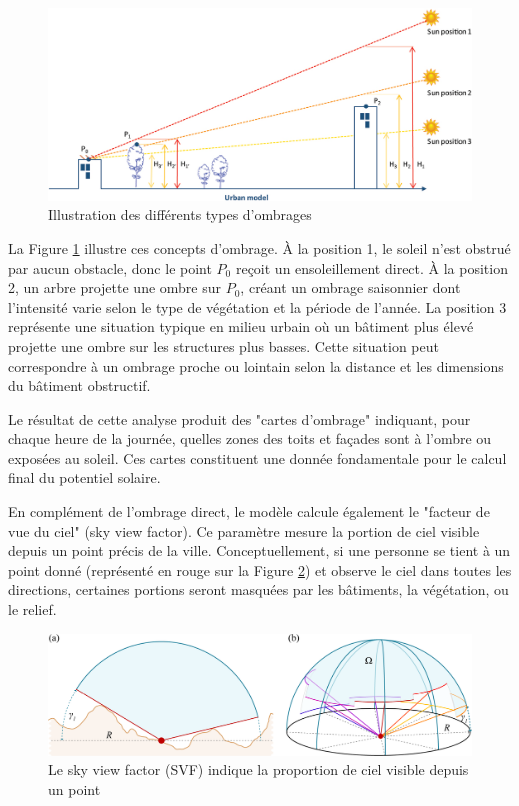 \begin{figure}[H]
    \centering
    \includegraphics[width=1.00\linewidth]{02-main/figures/ch2/cadastre_solaire_ombrage.jpg}
    \caption{Illustration des différents types d'ombrages \cite{desthieux_solar_2018}}
    \label{fig:cadastre_solaire_ombrage}
\end{figure}
\par{La Figure \ref{fig:cadastre_solaire_ombrage} illustre ces concepts d'ombrage. À la position 1, le soleil n'est obstrué par aucun obstacle, donc le point $P_0$ reçoit un ensoleillement direct. À la position 2, un arbre projette une ombre sur $P_0$, créant un ombrage saisonnier dont l'intensité varie selon le type de végétation et la période de l'année. La position 3 représente une situation typique en milieu urbain où un bâtiment plus élevé projette une ombre sur les structures plus basses. Cette situation peut correspondre à un ombrage proche ou lointain selon la distance et les dimensions du bâtiment obstructif.}
\par{Le résultat de cette analyse produit des "cartes d'ombrage" indiquant, pour chaque heure de la journée, quelles zones des toits et façades sont à l'ombre ou exposées au soleil. Ces cartes constituent une donnée fondamentale pour le calcul final du potentiel solaire.}
\par{En complément de l'ombrage direct, le modèle calcule également le "facteur de vue du ciel" (sky view factor). Ce paramètre mesure la portion de ciel visible depuis un point précis de la ville. Conceptuellement, si une personne se tient à un point donné (représenté en rouge sur la Figure \ref{fig:cadastre_solaire_svf}) et observe le ciel dans toutes les directions, certaines portions seront masquées par les bâtiments, la végétation, ou le relief.}
\begin{figure}[H]
    \centering
    \includegraphics[width=1\linewidth]{02-main/figures/ch2/ch2_cadastre_solaire_svf.png}
    \caption{Le sky view factor (SVF) indique la proportion de ciel visible depuis un point \cite{zaksek_sky-view_2011}}
    \label{fig:cadastre_solaire_svf}
\end{figure}
